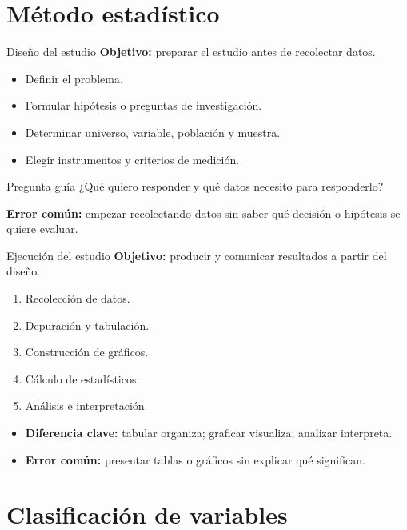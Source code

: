 \documentclass[aspectratio=169,11pt]{beamer}
\newcommand{\errorcomun}[1]{\textbf{Error común:} #1}
\newcommand{\diferencia}[1]{\textbf{Diferencia clave:} #1}
\begin{document}
\section{Método estadístico}

\begin{frame}{Diseño del estudio}
\textbf{Objetivo:} preparar el estudio antes de recolectar datos.
\begin{itemize}
  \item Definir el problema.
  \item Formular hipótesis o preguntas de investigación.
  \item Determinar universo, variable, población y muestra.
  \item Elegir instrumentos y criterios de medición.
\end{itemize}
\begin{block}{Pregunta guía}
¿Qué quiero responder y qué datos necesito para responderlo?
\end{block}
\errorcomun{empezar recolectando datos sin saber qué decisión o hipótesis se quiere evaluar.}
\end{frame}

\begin{frame}{Ejecución del estudio}
\textbf{Objetivo:} producir y comunicar resultados a partir del diseño.
\begin{enumerate}
  \item Recolección de datos.
  \item Depuración y tabulación.
  \item Construcción de gráficos.
  \item Cálculo de estadísticos.
  \item Análisis e interpretación.
\end{enumerate}
\begin{itemize}
  \item \diferencia{tabular organiza; graficar visualiza; analizar interpreta.}
  \item \errorcomun{presentar tablas o gráficos sin explicar qué significan.}
\end{itemize}
\end{frame}

\section{Clasificación de variables}
\end{document}
